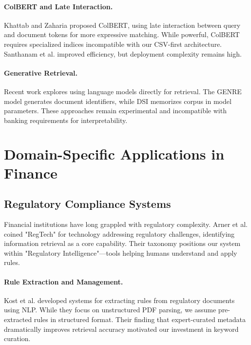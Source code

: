 \paragraph{ColBERT and Late Interaction.} Khattab and Zaharia \cite{khattab2020colbert} proposed ColBERT, using late interaction between query and document tokens for more expressive matching. While powerful, ColBERT requires specialized indices incompatible with our CSV-first architecture. Santhanam et al. \cite{santhanam2022colbertv2} improved efficiency, but deployment complexity remains high.

\paragraph{Generative Retrieval.} Recent work explores using language models directly for retrieval. The GENRE model \cite{de2021autoregressive} generates document identifiers, while DSI \cite{tay2022transformer} memorizes corpus in model parameters. These approaches remain experimental and incompatible with banking requirements for interpretability.

\section{Domain-Specific Applications in Finance}

\subsection{Regulatory Compliance Systems}

Financial institutions have long grappled with regulatory complexity. Arner et al. \cite{arner2017fintech} coined "RegTech" for technology addressing regulatory challenges, identifying information retrieval as a core capability. Their taxonomy positions our system within "Regulatory Intelligence"—tools helping humans understand and apply rules.

\paragraph{Rule Extraction and Management.} Kost et al. \cite{kost2020extracting} developed systems for extracting rules from regulatory documents using NLP. While they focus on unstructured PDF parsing, we assume pre-extracted rules in structured format. Their finding that expert-curated metadata dramatically improves retrieval accuracy motivated our investment in keyword curation.

